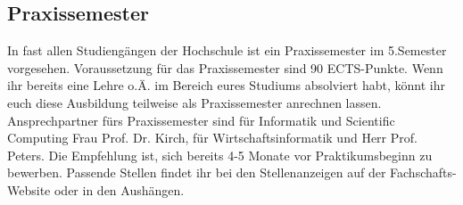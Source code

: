 \subsection{Praxissemester}
In fast allen Studiengängen der Hochschule ist ein Praxissemester im 
5.Semester vorgesehen. Voraussetzung für das Praxissemester sind 
90 ECTS-Punkte. Wenn ihr bereits eine Lehre o.Ä. im Bereich eures 
Studiums absolviert habt, könnt ihr euch diese Ausbildung teilweise als 
Praxissemester anrechnen lassen. Ansprechpartner fürs Praxissemester 
sind für Informatik und Scientific Computing Frau Prof. Dr. Kirch, für 
Wirtschaftsinformatik und Herr Prof. Peters.
Die Empfehlung ist, sich bereits 4-5 Monate vor Praktikumsbeginn zu 
bewerben. Passende Stellen findet ihr bei den Stellenanzeigen auf der 
Fachschafts-Website oder in den Aushängen.